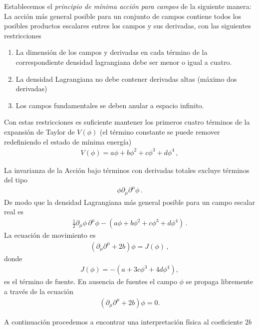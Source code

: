 Establecemos el \emph{principio de mínima acción para campos} de la siguiente manera: La acción más general posible para un conjunto de campos contiene todos los posibles productos escalares entres los campos y sus derivadas, con las siguientes restricciones
\begin{frame}
\begin{enumerate}
\item La dimensión de los campos y derivadas en cada término de la correspondiente densidad lagrangiana debe ser menor o igual a cuatro.
\item La densidad Lagrangiana no debe contener derivadas altas (máximo dos derivadas)
\item Los campos fundamentales se deben anular a espacio infinito.
\end{enumerate}
Con estas restricciones es suficiente mantener los primeros cuatro términos de la expansión de Taylor de $V(\phi)$ (el término constante se puede remover redefiniendo el estado de mínima energía)
\begin{align}
  \label{eq:fullV}
  V(\phi)=a \phi + b\phi^2+c\phi^3+d\phi^4\,,
\end{align}

La invarianza de la Acción bajo términos con derivadas totales excluye términos del tipo
\begin{align}
    \phi\partial_\mu \partial^\mu \phi\,.
\end{align}
De modo que la densidad Lagrangiana más general posible para un campo escalar real es
\begin{align}
  \frac{1}{2}{\partial_\mu\phi}\,{\partial^\mu\phi}-\left( a \phi + b\phi^2+c\phi^3+d\phi^4 \right)\,.
\end{align}
La ecuación de movimiento es
\begin{align}
  \left( \partial_\mu \partial^{\mu} +2b \right)\phi= J(\phi)\,,
\end{align}
donde
\begin{align}
  J(\phi)=- \left( a + 3c\phi^3 + 4d\phi^4 \right),
\end{align}
es el término de fuente. En ausencia de fuentes el campo $\phi$ se propaga libremente a través de la ecuación
\begin{align}
  \left( \partial_\mu \partial^{\mu} +2b \right)\phi= 0.
\end{align}

A continuación procedemos a encontrar una interpretación física al coeficiente $2b$
\end{frame}
